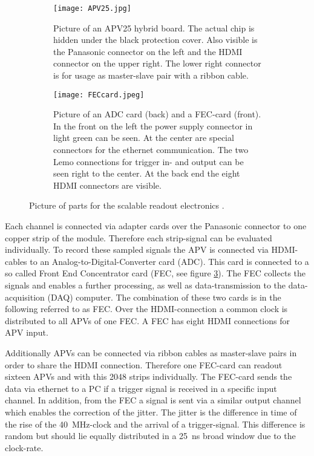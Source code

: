 \documentclass[
twoside,            %
BCOR1.4cm,          %
10pt,               %
headings=normal,    %
headsepline,        %
clearplainpage,		%
final,              %
div=14,
open=right,
bibliography=toc
]{scrreprt}
\begin{document}
\begin{figure}[!h]
	\begin{subfigure}[b]{0.48\textwidth}
		\centering
		\texttt{[image: APV25.jpg]}
		\caption{
			Picture of an APV25 hybrid board.
			The actual chip is hidden under the black protection cover.
			Also visible is the Panasonic connector on the left and the HDMI connector on the upper right.
			The lower right connector is for usage as master-slave pair with a ribbon cable.
		}
		\label{APVpic} 
	\end{subfigure}
	\hfill
	\begin{subfigure}[b]{0.48\textwidth}
		\centering
		\texttt{[image: FECcard.jpeg]}
		\caption{
			Picture of an ADC card (back) and a FEC-card (front).
			In the front on the left the power supply connector in light green  can be seen.
			At the center are special connectors for the ethernet communication.
			The two Lemo connections for trigger in- and output can be seen right to the center.
			At the back end the eight HDMI connectors are visible.
		}
		\label{FECpic} 
	\end{subfigure}
	\vspace{-2mm}
	\caption{
		Picture of parts for the scalable readout electronics \cite{SRS}.
	}
\end{figure}
 
Each channel is connected via adapter cards over the Panasonic connector to one copper strip of the module.
Therefore each strip-signal can be evaluated individually. 
To record these sampled signals the APV is connected via HDMI-cables to an Analog-to-Digital-Converter card (ADC).
This card is connected to a so called Front End Concentrator card (FEC, see figure \ref{FECpic}).
The FEC collects the signals and enables a further processing, as well as data-transmission to the data-acquisition (DAQ) computer.
The combination of these two cards is in the following referred to as FEC.
Over the HDMI-connection a common clock is distributed to all APVs of one FEC.
A FEC has eight HDMI connections for APV input.

Additionally APVs can be connected via ribbon cables as master-slave pairs in order to share the HDMI connection.
Therefore one FEC-card can readout sixteen APVs and with this 2048 strips individually.
The FEC-card sends the data via ethernet to a PC if a trigger signal is received in a specific input channel.
In addition, from the FEC a signal is sent via a similar output channel which enables the correction of the jitter.
The jitter is the difference in time of the rise of the \SI{40}{MHz}-clock and the arrival of a trigger-signal.
This difference is random but should lie equally distributed in a \SI{25}{ns} broad window due to the clock-rate.
\end{document}
